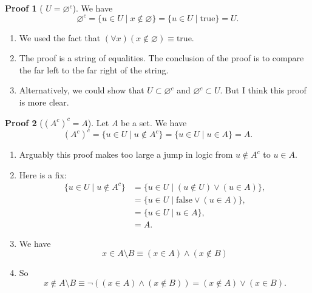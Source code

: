 \documentclass[fleqn]{beamer}
\newcommand{\true}{\mathrm{true}}
\newcommand{\false}{\mathrm{false}}
\theoremstyle{definition}
\newtheorem{myproof}{Proof}[]
\newenvironment{checklist}{
  \begin{enumerate}[\ding{51}]
    \addtolength{\itemsep}{-0.0\itemsep}}
  {\end{enumerate}}
\begin{document}
\begin{frame}

\begin{myproof}[ \(U  = \varnothing^c\)] We have
\[
     \varnothing^c = \{ u \in U \mid x \notin \varnothing \} = \{ u \in U \mid  \true \} = U.
\]
\end{myproof}


\begin{checklist}

\vspace{0.2in}

\item We used the fact that   \( (\forall x)(x \notin \varnothing) \equiv \true\).

\vspace{0.2in}
\item The proof is a string of equalities. The conclusion of the proof is to compare the far left to the far right of the string.

\vspace{0.2in}

\item Alternatively, we could show that \(U  \subset  \varnothing^c\) and \(\varnothing^c \subset U\).  But I think this proof is more clear.
\end{checklist}

\end{frame}
\begin{frame}

\begin{myproof}[\((A^c)^c  = A\)] Let \(A\) be a set. We have
\[
     (A^c)^c = \{ u \in U \mid u \notin A^c \} =  \{ u \in U \mid u \in A \} = A .
\]
\end{myproof}

\begin{checklist}

\item Arguably this proof makes too large a jump in logic from  \(u \notin A^c \) to \(u \in A\).

\item Here is a fix:
\begin{align*}
      \{ u \in U \mid u \notin A^c \} &=  \{ u \in U \mid  (u \notin U) \lor  (u  \in A)\}, \\
                                                               &=  \{ u \in U \mid  \false  \lor  (u  \in A)\} , \\
                                                              &=   \{ u \in U \mid  u  \in A\},\\
                                                              &    = A.
 \end{align*}

 \item We have
 \[
     x \in A \setminus B \equiv (x \in A) \land (x \notin B)
 \]


  \item So
 \[
     x \notin A \setminus B \equiv    \lnot ((x \in A) \land (x \notin B)) = (x \notin A) \lor (x \in B).
 \]
\end{checklist}

\end{frame}
\end{document}
